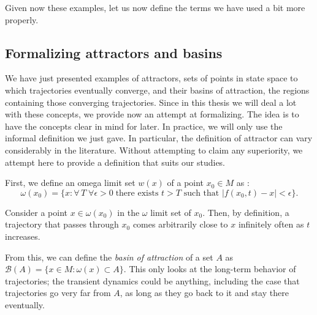 Given now these examples, let us now define the terms we have used a bit more properly. 

% 
\subsection{Formalizing attractors and basins}
We have just presented examples of attractors, sets of points in state space to which trajectories eventually converge, and their basins of attraction, the regions containing those converging trajectories. Since in this thesis we will deal a lot with these concepts, we provide now an attempt at formalizing. The idea is to have the concepts clear in mind for later. In practice, we will only use the informal definition we just gave. In particular, the definition of attractor can vary considerably in the literature. Without attempting to claim any superiority, we attempt here to provide a definition that suits our studies.  

First, we define an omega limit set $w(x)$ of a point $x_0 \in M$ as \cite{milnor1985on}: 
% 
\begin{equation}
    \omega(x_0) = \{x: \forall\,T \;\forall \epsilon > 0\; \text{there exists } t > T \text{ such that } |f(x_0, t) - x| < \epsilon    \}.
\end{equation}

Consider a point $x \in\omega(x_0)$ in the $\omega$ limit set of $x_0$. Then, by definition, a trajectory that passes through $x_0$ comes arbitrarily close to $x$ infinitely often as $t$ increases. 

From this, we can define the \textit{basin of attraction} of a set $A$ as $\mathcal{B}(A) = \{x \in M: \omega(x) \subset A\}$. This only looks at the long-term behavior of trajectories; the transient dynamics could be anything, including the case that trajectories go very far from $A$, as long as they go back to it and stay there eventually. 


